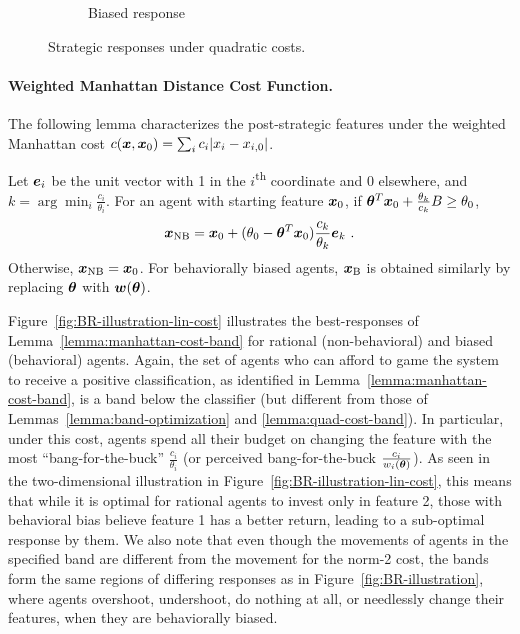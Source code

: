 \begin{figure}[ht]
\begin{subfigure}[t]{0.22\textwidth}
        \caption{Biased response}
        \label{fig:B-arrows-quad-cost}
    \end{subfigure}
    \caption{Strategic responses under quadratic costs.}
    \label{fig:BR-illustration-quad-cost}
\end{figure} 

\paragraph{Weighted Manhattan Distance Cost Function.}
The following lemma characterizes the post-strategic features under the weighted Manhattan cost $c({\bm{x}}, {\bm{x}}_0)=\sum_i c_i|x_{i}-x_{i,0}|$.
\begin{lemma}\label{lemma:manhattan-cost-band}
    Let ${\bm{e}}_i$ be the unit vector with 1 in the $i$\textsuperscript{th} coordinate and 0 elsewhere, and $k = \arg\min_i \frac{c_i}{\theta_i}$. For an agent with starting feature ${\bm{x}}_0$, if ${\bm{\theta}}^T{\bm{x}}_0 + \frac{\theta_k}{c_k}B \ge \theta_0$,
    \begin{align*}
        {\bm{x}}_\text{NB} = {\bm{x}}_0 + (\theta_0-{\bm{\theta}}^T{\bm{x}}_0)\frac{c_k}{\theta_k}{\bm{e}}_k~.
    \end{align*}
    Otherwise, ${\bm{x}}_\text{NB}={\bm{x}}_0$. For behaviorally biased agents, ${\bm{x}}_\text{B}$ is obtained similarly by replacing ${\bm{\theta}}$ with ${\bm{w}}({\bm{\theta}})$.
\end{lemma}

Figure~\ref{fig:BR-illustration-lin-cost} illustrates the best-responses of Lemma~\ref{lemma:manhattan-cost-band} for rational (non-behavioral) and biased (behavioral) agents.
Again, the set of agents who can afford to game the system to receive a positive classification, as identified in Lemma~\ref{lemma:manhattan-cost-band}, is a band below the classifier (but different from those of Lemmas~\ref{lemma:band-optimization} and \ref{lemma:quad-cost-band}). In particular, under this cost, agents spend all their budget on changing the feature with the most ``bang-for-the-buck'' $\frac{c_i}{\theta_i}$ (or perceived bang-for-the-buck $\frac{c_i}{w_i({\bm{\theta}})}$). As seen in the two-dimensional illustration in Figure~\ref{fig:BR-illustration-lin-cost}, this means that while it is optimal for rational agents to invest only in feature 2, those with behavioral bias believe feature 1 has a better return, leading to a sub-optimal response by them. We also note that even though the movements of agents in the specified band are different from the movement for the norm-2 cost, the bands form the same regions of differing responses as in Figure~\ref{fig:BR-illustration}, where agents overshoot, undershoot, do nothing at all, or needlessly change their features, when they are behaviorally biased. 

